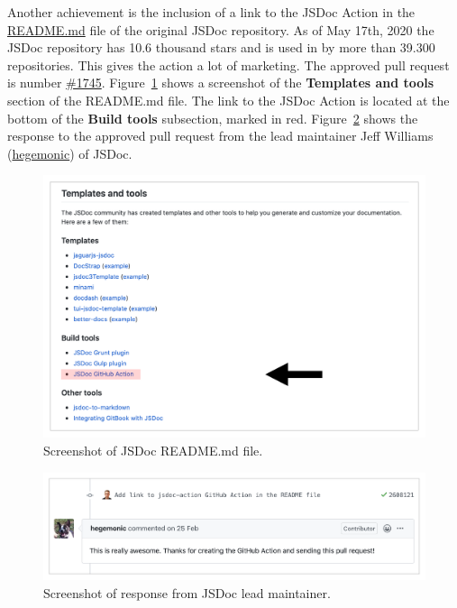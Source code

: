 Another achievement is the inclusion of a link to the JSDoc Action in the \href{https://github.com/jsdoc/jsdoc/blob/master/README.md}{README.md} file of the original JSDoc repository. As of May 17th, 2020 the JSDoc repository has 10.6 thousand stars and is used in by more than 39.300 repositories. This gives the action a lot of marketing. The approved pull request is number \href{https://github.com/jsdoc/jsdoc/pull/1745}{\#1745}. 
Figure~\ref{fig:jsdoc-link-readme} shows a screenshot of the \textbf{Templates and tools} section of the README.md file. The link to the JSDoc Action is located at the bottom of the \textbf{Build tools} subsection, marked in red.
Figure~\ref{fig:comment-hegemonic} shows the response to the approved pull request from the lead maintainer Jeff Williams (\href{https://github.com/hegemonic}{hegemonic}) of JSDoc.
\begin{figure}[htp]
    \centering
    \includegraphics[width=\textwidth]{sections/result/figures/jsdoc-readme.png}
    \caption{Screenshot of JSDoc README.md file.}
    \label{fig:jsdoc-link-readme}
\end{figure}
\begin{figure}[htp]
    \centering
    \includegraphics[width=\textwidth]{sections/result/figures/jsdoc-action-pull-request-approval-jsdoc.png}
    \caption{Screenshot of response from JSDoc lead maintainer.}
    \label{fig:comment-hegemonic}
\end{figure}
